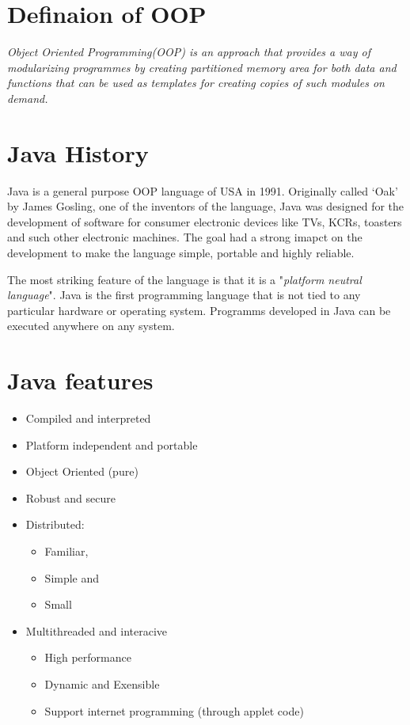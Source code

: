 \documentclass[11pt, a4paper]{book}
\begin{document}
    \section{Definaion of OOP}
      \textit{Object Oriented Programming(OOP) is an approach that provides a way of modularizing programmes by creating partitioned memory area for both data and functions that can be used as templates for creating copies of such modules on demand.}
  
    \section{Java History}
      Java is a general purpose OOP language of USA in 1991. Originally called `Oak' by James Gosling, one of the inventors of the language, Java was designed for the development of software for consumer electronic devices like TVs, KCRs, toasters and such other electronic machines. The goal had a strong imapct on the development to make the language simple, portable and highly reliable.
  
      The most striking feature of the language is that it is a "\textit{platform neutral language}". Java is the first programming language that is not tied to any particular hardware or operating system. Programms developed in Java can be executed anywhere on any system.
    
    \section{Java features}
      \begin{itemize}
  
        \item Compiled and interpreted
        \item Platform independent and portable
        \item Object Oriented (pure)
        \item Robust and secure
        \item Distributed:
  
        \begin{itemize}
  
          \item Familiar,
          \item Simple and 
          \item Small
  
        \end{itemize}
  
        \item Multithreaded and interacive
  
        \begin{itemize}
  
          \item High performance
          \item Dynamic and Exensible
          \item Support internet programming (through applet code)
  
        \end{itemize}
  
      \end{itemize}
  
\end{document}

